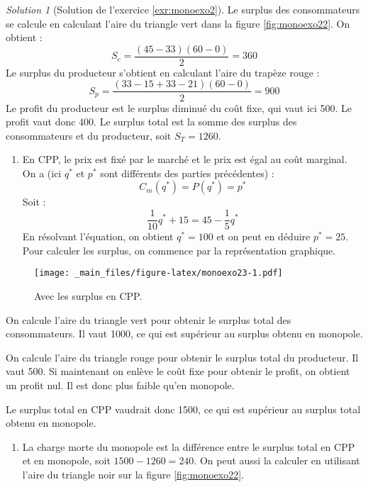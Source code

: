 \documentclass[
]{book}
\providecommand{\tightlist}{%
  \setlength{\itemsep}{0pt}\setlength{\parskip}{0pt}}
\theoremstyle{definition}
\theoremstyle{definition}
\theoremstyle{definition}
\theoremstyle{definition}
\theoremstyle{remark}
\newtheorem*{solution}{Solution}
\begin{document}
\begin{solution}[Solution de l'exercice \ref{exr:monoexo2}]
Le surplus des consommateurs se calcule en calculant l'aire du triangle vert dans la figure \ref{fig:monoexo22}.
On obtient :
\[S_c=\frac{(45-33)(60-0)}{2}=360\]
Le surplus du producteur s'obtient en calculant l'aire du trapèze rouge :
\[S_p=\frac{(33-15+33-21)(60-0)}{2}=900\]
Le profit du producteur est le surplus diminué du coût fixe, qui vaut ici 500. Le profit vaut donc 400.
Le surplus total est la somme des surplus des consommateurs et du producteur, soit \(S_T=1260\).

\begin{enumerate}
\def\labelenumi{\arabic{enumi}.}
\setcounter{enumi}{4}
\tightlist
\item
  En CPP, le prix est fixé par le marché et le prix est égal au coût marginal.
  On a (ici \(q^*\) et \(p^*\) sont différents des parties précédentes) :
  \[C_m(q^*)=P(q^*)=p^*\]
  Soit :
  \[\frac{1}{10}q^*+15=45-\frac{1}{5}q^*\]
  En résolvant l'équation, on obtient \(q^*=100\) et on peut en déduire \(p^*=25\).
  Pour calculer les surplus, on commence par la représentation graphique.
\end{enumerate}

\begin{figure}
\centering
\texttt{[image: \_main\_files/figure-latex/monoexo23-1.pdf]}
\caption{\label{fig:monoexo23}Avec les surplus en CPP.}
\end{figure}

On calcule l'aire du triangle vert pour obtenir le surplus total des consommateurs.
Il vaut 1000, ce qui est supérieur au surplus obtenu en monopole.

On calcule l'aire du triangle rouge pour obtenir le surplus total du producteur.
Il vaut 500.
Si maintenant on enlève le coût fixe pour obtenir le profit, on obtient un profit nul.
Il est donc plus faible qu'en monopole.

Le surplus total en CPP vaudrait donc 1500, ce qui est supérieur au surplus total obtenu en monopole.

\begin{enumerate}
\def\labelenumi{\arabic{enumi}.}
\setcounter{enumi}{5}
\tightlist
\item
  La charge morte du monopole est la différence entre le surplus total en CPP et en monopole, soit \(1500-1260=240\).
  On peut aussi la calculer en utilisant l'aire du triangle noir sur la figure \ref{fig:monoexo22}.
\end{enumerate}

\end{solution}
\end{document}
